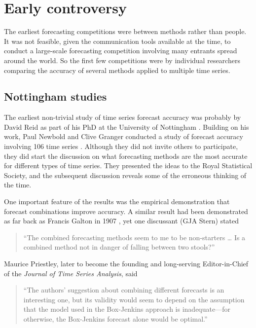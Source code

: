 \documentclass[11pt,a4paper,]{article}
\begin{document}
\hypertarget{sec:controversy}{%
\section{Early controversy}\label{sec:controversy}}

The earliest forecasting competitions were between methods rather than people. It was not feasible, given the communication tools available at the time, to conduct a large-scale forecasting competition involving many entrants spread around the world. So the first few competitions were by individual researchers comparing the accuracy of several methods applied to multiple time series.

\hypertarget{nottingham-studies}{%
\subsection*{Nottingham studies}\label{nottingham-studies}}

The earliest non-trivial study of time series forecast accuracy was probably by David Reid as part of his PhD at the University of Nottingham \autocite{reidphd}. Building on his work, Paul Newbold and Clive Granger conducted a study of forecast accuracy involving 106 time series \autocite{NewboldGranger74}. Although they did not invite others to participate, they did start the discussion on what forecasting methods are the most accurate for different types of time series. They presented the ideas to the Royal Statistical Society, and the subsequent discussion reveals some of the erroneous thinking of the time.

One important feature of the results was the empirical demonstration that forecast combinations improve accuracy. A similar result had been demonstrated as far back as Francis Galton in 1907 \autocite{Wallis2014}, yet one discussant (GJA Stern) stated

\begin{quote}
``The combined forecasting methods seem to me to be non-starters \ldots{} Is a combined method not in danger of falling between two stools?''
\end{quote}

Maurice Priestley, later to become the founding and long-serving Editor-in-Chief of the \emph{Journal of Time Series Analysis}, said

\begin{quote}
``The authors' suggestion about combining different forecasts is an interesting one, but its validity would seem to depend on the assumption that the model used in the Box-Jenkins approach is inadequate---for otherwise, the Box-Jenkins forecast alone would be optimal.''
\end{quote}
\end{document}
